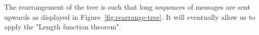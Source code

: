 

The rearrangement of the tree is such that long sequences of messages are sent upwards as displayed in Figure~\ref{fig:rearrange-tree}. It will eventually allow us to apply the "Length function theorem". 


